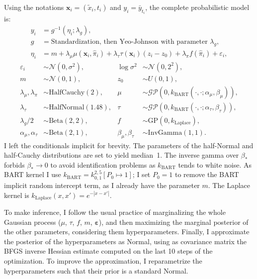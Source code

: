 \documentclass[a4paper]{article}
\theoremstyle{definition}
\let\oldmarginpar\marginpar
\renewcommand{\marginpar}[1]{\oldmarginpar{\sffamily\scriptsize #1}}
\renewcommand{\marginpar}[1]{\relax} %
\begin{document}
    Using the notations $\mathbf x_i = (\tilde x_i, t_i)$ and $y_i = \bar y_{t_i}$, the complete probabilistic model is:
    \begin{align}
        y_i &= g^{-1}(\eta_i; \lambda_g), \\
        g &= \text{Standardization, then Yeo-Johnson with parameter $\lambda_g$}, \\
        \eta_i &= m +
                \lambda_\mu \mu(\mathbf x_i, \hat\pi_i) +
                \lambda_\tau \tau(\mathbf x_i) (z_i - z_0) +
                \lambda_\pi f(\hat\pi_i) +
                \varepsilon_i,
    \end{align}
    \begin{align}
        \varepsilon_i &\sim \mathcal N(0, \sigma^2), &
        \log \sigma^2 &\sim \mathcal N(0, 2^2), \label{eq:bcferrorvar} \\
        m &\sim \mathcal N(0, 1), &
        z_0 &\sim U(0, 1), \\
        \lambda_\mu, \lambda_\pi &\sim \mathrm{HalfCauchy}(2), &
        \mu &\sim \mathcal{GP}(0, k_\mathrm{BART}(\cdot,\cdot;\alpha_\mu, \beta_\mu) ), \\
        \lambda_\tau &\sim \mathrm{HalfNormal}(1.48), &
        \tau &\sim \mathcal{GP}(0, k_\mathrm{BART}(\cdot,\cdot;\alpha_\tau, \beta_\tau) ), \\
        \lambda_g/2 &\sim \mathrm{Beta}(2,2), &
        f & \sim \mathrm{GP}(0, k_\text{Laplace}), \\
        \alpha_\mu, \alpha_\tau &\sim \mathrm{Beta}(2, 1), &
        \beta_\mu, \beta_\tau &\sim \mathrm{InvGamma}(1, 1).
    \end{align}
    I left the conditionals implicit for brevity. The parameters of the half-Normal and half-Cauchy distributions are set to yield median~1. The inverse gamma over $\beta_*$ forbids $\beta_* \to 0$ to avoid identification problems as $k_\mathrm{BART}$ tends to white noise. As BART kernel I use $k_\text{BART} = k^{2,5}_{0,1}[P_0 \mapsto 1]$; I set $P_0=1$ to remove the BART implicit random intercept term, as I already have the parameter $m$. The Laplace kernel is $k_\text{Laplace}(x,x') = e^{-|x-x'|}$.

    To make inference, I follow the usual practice of marginalizing the whole Gaussian process ($\mu$, $\tau$, $f$, $m$, $\boldsymbol\varepsilon$), and then maximizing the marginal posterior of the other parameters, considering them hyperparameters. Finally, I approximate the posterior of the hyperparameters as Normal, using as covariance matrix the BFGS\marginpar{BFGS has one article to cite per acronym letter, so I won't do it.} inverse Hessian estimate computed on the last 10 steps of the optimization. To improve the approximation, I reparametrize the hyperparameters such that their prior is a standard Normal.
\end{document}
